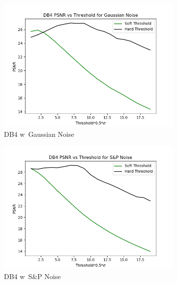 \documentclass{article}
\begin{document}
\begin{figure}[h!]
	\centering
	\begin{subfigure}[b]{0.45\linewidth}
		\includegraphics[width=\linewidth]{../../1_Resources/images/DB4_threshold_g.png}
		\caption{DB4 w\ Gaussian Noise}
	\end{subfigure}
	\begin{subfigure}[b]{0.45\linewidth}
		\includegraphics[width=\linewidth]{../../1_Resources/images/DB4_threshold_sp.png}
		\caption{DB4 w\ S\&P Noise}
	\end{subfigure}
	\begin{subfigure}[b]{0.45\linewidth}

\end{subfigure}
\end{figure}
\end{document}
